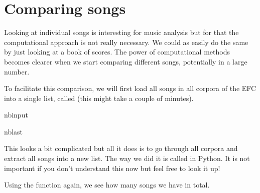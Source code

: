 \documentclass[letterpaper,10pt,english]{sphinxmanual}
\begin{document}
\section{Comparing songs}
\label{\detokenize{03_melody_I:Comparing-songs}}
\sphinxAtStartPar
Looking at individual songs is interesting for music analysis but for that the computational approach is not really necessary. We could as easily do the same by just looking at a book of scores. The power of computational methods becomes clearer when we start comparing different songs, potentially in a large number.

\sphinxAtStartPar
To facilitate this comparison, we will first load all songs in all corpora of the EFC into a single list, called  (this might take a couple of minutes).

\begin{sphinxuseclass}{nbinput}
\begin{sphinxuseclass}{nblast}
{
\begin{sphinxVerbatim}[commandchars=\\\{\}]
\llap{\color{nbsphinxin}[17]:\,\hspace{\fboxrule}\hspace{\fboxsep}}  \PYG{p}{[}        \PYG{p}{[}\PYG{p}{]} \PYG{p}{]}
\end{sphinxVerbatim}
}

\end{sphinxuseclass}
\end{sphinxuseclass}
\sphinxAtStartPar
This looks a bit complicated but all it does is to go through all corpora and extract all songs into a new list. The way we did it is called  in Python. It is not important if you don’t understand this now but feel free to look it up!

\sphinxAtStartPar
Using the  function again, we see how many songs we have in total.
\end{document}
